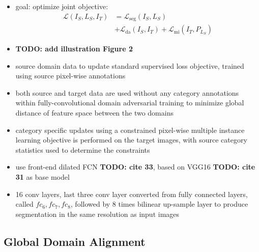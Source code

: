 \documentclass[]{article}
\newcommand{\todo}[1]{{\color{red}\bf{TODO: #1}}}
\begin{document}
\begin{itemize}
	\item goal: optimize joint objective:
	\begin{align}
	\mathcal{L}(I_S,L_S,I_T) &= \mathcal{L}_{\text{seg}}(I_S, L_S)\\
	&+ \mathcal{L}_{\text{da}}(I_S, I_T) + \mathcal{L}_{\text{mi}}(I_T,P_{L_S})
	\end{align}
	\item \todo{add illustration Figure 2}
	\item source domain data to update standard supervised loss objective, trained using source pixel-wise annotations
	\item both source and target data are used without any category annotations within fully-convolutional domain adversarial training to minimize global distance of feature space between the two domains
	\item category specific updates using a constrained pixel-wise multiple instance learning objective is performed on the target images, with source category statistics used to determine the constraints
	\item use front-end dilated FCN \todo{cite 33}, based on VGG16 \todo{cite 31} as base model
	\item 16 conv layers, last three conv layer converted from fully connected layers, called $f c_6, f c_7, f c_8$, followed by 8 times bilinear up-sample layer to produce segmentation in the same resolution as input images
\end{itemize}

\subsection{Global Domain Alignment}
\end{document}
